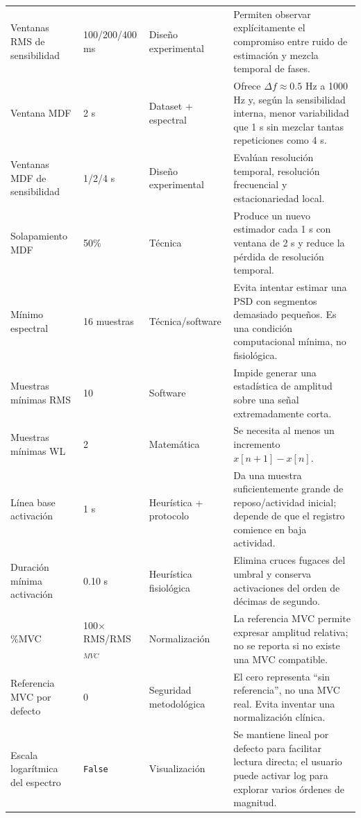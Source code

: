 \documentclass[11pt,spanish]{article}
\begin{document}
\begin{longtable}{p{3.2cm}p{1.7cm}p{2.2cm}p{7.0cm}}
Ventanas RMS de sensibilidad & 100/200/400 ms & Diseño experimental & Permiten observar explícitamente el compromiso entre ruido de estimación y mezcla temporal de fases.\\
Ventana MDF & 2 s & Dataset + espectral & Ofrece $\Delta f\approx0.5$ Hz a 1000 Hz y, según la sensibilidad interna, menor variabilidad que 1 s sin mezclar tantas repeticiones como 4 s.\\
Ventanas MDF de sensibilidad & 1/2/4 s & Diseño experimental & Evalúan resolución temporal, resolución frecuencial y estacionariedad local.\\
Solapamiento MDF & 50\% & Técnica & Produce un nuevo estimador cada 1 s con ventana de 2 s y reduce la pérdida de resolución temporal.\\
Mínimo espectral & 16 muestras & Técnica/software & Evita intentar estimar una PSD con segmentos demasiado pequeños. Es una condición computacional mínima, no fisiológica.\\
Muestras mínimas RMS & 10 & Software & Impide generar una estadística de amplitud sobre una señal extremadamente corta.\\
Muestras mínimas WL & 2 & Matemática & Se necesita al menos un incremento $x[n+1]-x[n]$.\\
Línea base activación & 1 s & Heurística + protocolo & Da una muestra suficientemente grande de reposo/actividad inicial; depende de que el registro comience en baja actividad.\\
Duración mínima activación & 0.10 s & Heurística fisiológica & Elimina cruces fugaces del umbral y conserva activaciones del orden de décimas de segundo.\\
\%MVC & 100$\times$RMS/RMS$_{MVC}$ & Normalización & La referencia MVC permite expresar amplitud relativa; no se reporta si no existe una MVC compatible.\\
Referencia MVC por defecto & 0 & Seguridad metodológica & El cero representa ``sin referencia'', no una MVC real. Evita inventar una normalización clínica.\\
Escala logarítmica del espectro & \texttt{False} & Visualización & Se mantiene lineal por defecto para facilitar lectura directa; el usuario puede activar log para explorar varios órdenes de magnitud.\\
\bottomrule
\end{longtable}
\end{document}
